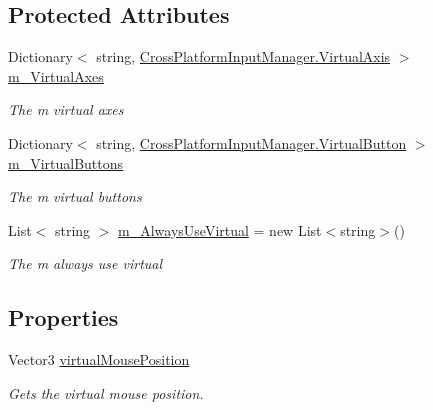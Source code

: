 \subsection*{Protected Attributes}
\begin{DoxyCompactItemize}
\item 
Dictionary$<$ string, \hyperlink{class_lerp2_assets_1_1_cross_platform_input_1_1_cross_platform_input_manager_1_1_virtual_axis}{Cross\+Platform\+Input\+Manager.\+Virtual\+Axis} $>$ \hyperlink{class_lerp2_assets_1_1_cross_platform_input_1_1_cross_platform_input_1_1_virtual_input_a8619de65809b02ab2350df3b796a9f81}{m\+\_\+\+Virtual\+Axes}
\begin{DoxyCompactList}\small\item\em The m virtual axes \end{DoxyCompactList}\item 
Dictionary$<$ string, \hyperlink{class_lerp2_assets_1_1_cross_platform_input_1_1_cross_platform_input_manager_1_1_virtual_button}{Cross\+Platform\+Input\+Manager.\+Virtual\+Button} $>$ \hyperlink{class_lerp2_assets_1_1_cross_platform_input_1_1_cross_platform_input_1_1_virtual_input_a5e2cbf73500310144294c6fa57a2e885}{m\+\_\+\+Virtual\+Buttons}
\begin{DoxyCompactList}\small\item\em The m virtual buttons \end{DoxyCompactList}\item 
List$<$ string $>$ \hyperlink{class_lerp2_assets_1_1_cross_platform_input_1_1_cross_platform_input_1_1_virtual_input_a9dff7906d2f36b0510a306b4c8835056}{m\+\_\+\+Always\+Use\+Virtual} = new List$<$string$>$()
\begin{DoxyCompactList}\small\item\em The m always use virtual \end{DoxyCompactList}\end{DoxyCompactItemize}
\subsection*{Properties}
\begin{DoxyCompactItemize}
\item 
Vector3 \hyperlink{class_lerp2_assets_1_1_cross_platform_input_1_1_cross_platform_input_1_1_virtual_input_a35c28faa0b4349417e4ee85aad4176ca}{virtual\+Mouse\+Position}
\begin{DoxyCompactList}\small\item\em Gets the virtual mouse position. \end{DoxyCompactList}\end{DoxyCompactItemize}


